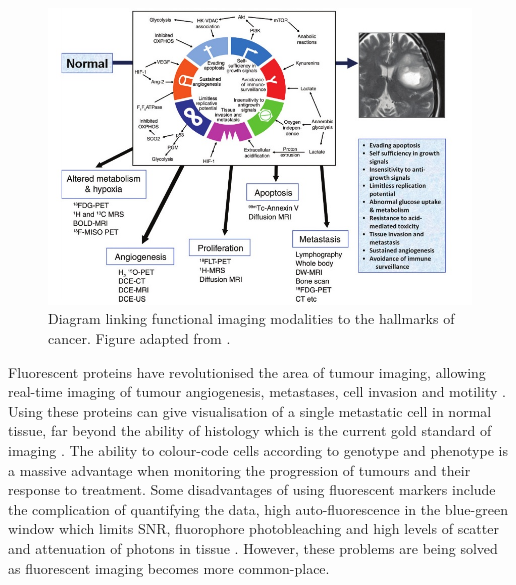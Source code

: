 



\begin{figure}[H]
\centering
\includegraphics[scale=0.6]{Padhani_2010_hallmarks.jpg}
\caption{Diagram linking functional imaging modalities to the hallmarks of cancer. Figure adapted from \cite{Padhani:2010hfa}.} %
\label{fig:padhani}
\end{figure}


Fluorescent proteins have revolutionised the area of tumour imaging, allowing real-time imaging of tumour angiogenesis, metastases, cell invasion and motility \cite{Hoffman:2005}. Using these proteins can give visualisation of a single metastatic  cell in normal tissue, far beyond the ability of histology which is the current gold standard of imaging \cite{Hoffman:2009}. The ability to colour-code cells according to genotype and phenotype is a massive advantage when monitoring the progression of tumours and their response to treatment.
Some disadvantages of using fluorescent markers include the complication of  quantifying the data, high auto-fluorescence in the blue-green window which limits SNR, fluorophore photobleaching and high levels of scatter and attenuation of photons in tissue \cite{Gross:2005}. However, these problems are being solved as fluorescent imaging becomes more common-place. 


